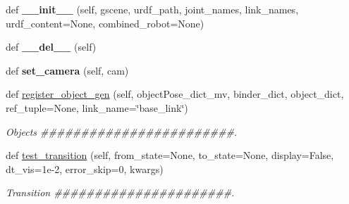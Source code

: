 \begin{DoxyCompactItemize}
\item 
\mbox{\label{classrnb-planning_1_1src_1_1pkg_1_1tmp__framework_1_1_t_m_p_framework_a53d020ecaa42f57d67f69f52eb3b6b21}} 
def {\bfseries \+\_\+\+\_\+init\+\_\+\+\_\+} (self, gscene, urdf\+\_\+path, joint\+\_\+names, link\+\_\+names, urdf\+\_\+content=None, combined\+\_\+robot=None)
\item 
\mbox{\label{classrnb-planning_1_1src_1_1pkg_1_1tmp__framework_1_1_t_m_p_framework_ab3eda4bc7dad7343aea6f52e6c846161}} 
def {\bfseries \+\_\+\+\_\+del\+\_\+\+\_\+} (self)
\item 
\mbox{\label{classrnb-planning_1_1src_1_1pkg_1_1tmp__framework_1_1_t_m_p_framework_ad40cb406a0ebe71fb9baec8346d79e27}} 
def {\bfseries set\+\_\+camera} (self, cam)
\item 
\mbox{\label{classrnb-planning_1_1src_1_1pkg_1_1tmp__framework_1_1_t_m_p_framework_ab2d3326b89c04823dcc420d883c9889e}} 
def \hyperlink{classrnb-planning_1_1src_1_1pkg_1_1tmp__framework_1_1_t_m_p_framework_ab2d3326b89c04823dcc420d883c9889e}{register\+\_\+object\+\_\+gen} (self, object\+Pose\+\_\+dict\+\_\+mv, binder\+\_\+dict, object\+\_\+dict, ref\+\_\+tuple=None, link\+\_\+name=\char`\"{}base\+\_\+link\char`\"{})
\begin{DoxyCompactList}\small\item\em Objects \#\#\#\#\#\#\#\#\#\#\#\#\#\#\#\#\#\#\#\#\#\#\#\#. \end{DoxyCompactList}\item 
\mbox{\label{classrnb-planning_1_1src_1_1pkg_1_1tmp__framework_1_1_t_m_p_framework_af19778d826984c527f6efa333dc0e4a8}} 
def \hyperlink{classrnb-planning_1_1src_1_1pkg_1_1tmp__framework_1_1_t_m_p_framework_af19778d826984c527f6efa333dc0e4a8}{test\+\_\+transition} (self, from\+\_\+state=None, to\+\_\+state=None, display=False, dt\+\_\+vis=1e-\/2, error\+\_\+skip=0, kwargs)
\begin{DoxyCompactList}\small\item\em Transition \#\#\#\#\#\#\#\#\#\#\#\#\#\#\#\#\#\#\#\#\#\#. \end{DoxyCompactList}\item 

\end{DoxyCompactItemize}
